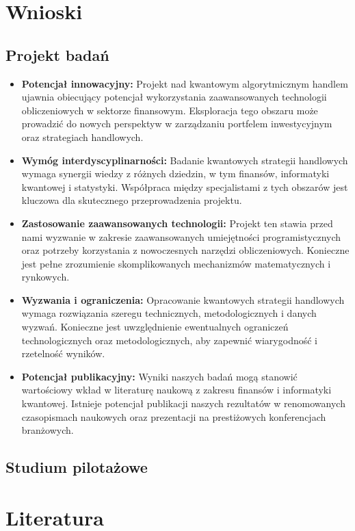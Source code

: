 \documentclass[polish,envcountsect,10pt]{article}
\begin{document}
\section{Wnioski}

\subsection{Projekt badań}

\begin{itemize}
    \item \textbf{Potencjał innowacyjny:} Projekt nad kwantowym algorytmicznym handlem ujawnia obiecujący potencjał wykorzystania zaawansowanych technologii obliczeniowych w sektorze finansowym. Eksploracja tego obszaru może prowadzić do nowych perspektyw w zarządzaniu portfelem inwestycyjnym oraz strategiach handlowych.
    
    \item \textbf{Wymóg interdyscyplinarności:} Badanie kwantowych strategii handlowych wymaga synergii wiedzy z różnych dziedzin, w tym finansów, informatyki kwantowej i statystyki. Współpraca między specjalistami z tych obszarów jest kluczowa dla skutecznego przeprowadzenia projektu.
    
    \item \textbf{Zastosowanie zaawansowanych technologii:} Projekt ten stawia przed nami wyzwanie w zakresie zaawansowanych umiejętności programistycznych oraz potrzeby korzystania z nowoczesnych narzędzi obliczeniowych. Konieczne jest pełne zrozumienie skomplikowanych mechanizmów matematycznych i rynkowych.
    
    \item \textbf{Wyzwania i ograniczenia:} Opracowanie kwantowych strategii handlowych wymaga rozwiązania szeregu technicznych, metodologicznych i danych wyzwań. Konieczne jest uwzględnienie ewentualnych ograniczeń technologicznych oraz metodologicznych, aby zapewnić wiarygodność i rzetelność wyników.
    
    \item \textbf{Potencjał publikacyjny:} Wyniki naszych badań mogą stanowić wartościowy wkład w literaturę naukową z zakresu finansów i informatyki kwantowej. Istnieje potencjał publikacji naszych rezultatów w renomowanych czasopismach naukowych oraz prezentacji na prestiżowych konferencjach branżowych.
\end{itemize}

\subsection{Studium pilotażowe}


\section{Literatura}
\end{document}
